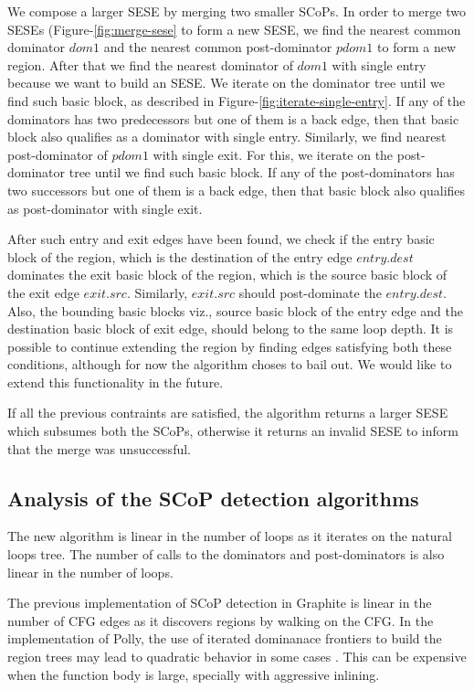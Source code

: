 \documentclass{sigplanconf}
\begin{document}

We compose a larger SESE by merging two smaller SCoPs. In order to merge two
SESEs (Figure-\ref{fig:merge-sese} to form a new SESE, we find the nearest
common dominator $dom1$ and the nearest common post-dominator $pdom1$ to form a
new region. After that we find the nearest dominator of $dom1$ with single entry
because we want to build an SESE.  We iterate on the dominator tree until we
find such basic block, as described in Figure-\ref{fig:iterate-single-entry}.
If any of the dominators has two predecessors but one of them is a back edge,
then that basic block also qualifies as a dominator with single entry.
Similarly, we find nearest post-dominator of $pdom1$ with single exit. For this,
we iterate on the post-dominator tree until we find such basic block. If any of
the post-dominators has two successors but one of them is a back edge, then that
basic block also qualifies as post-dominator with single exit.

After such entry and exit edges have been found, we check if the entry basic
block of the region, which is the destination of the entry edge $entry.dest$
dominates the exit basic block of the region, which is the source basic block of
the exit edge $exit.src$. Similarly, $exit.src$ should post-dominate the
$entry.dest$. Also, the bounding basic blocks viz., source basic block of the
entry edge and the destination basic block of exit edge, should belong to the
same loop depth. It is possible to continue extending the region by finding
edges satisfying both these conditions, although for now the algorithm choses
to bail out.  We would like to extend this functionality in the future.

If all the previous contraints are satisfied, the algorithm returns a larger
SESE which subsumes both the SCoPs, otherwise it returns an invalid SESE to
inform that the merge was unsuccessful.

\subsection{Analysis of the SCoP detection algorithms}
The new algorithm is linear in the number of loops as it iterates on the
natural loops tree.  The number of calls to the dominators and post-dominators
is also linear in the number of loops.

The previous implementation of SCoP detection in Graphite is linear in the
number of CFG edges as it discovers regions by walking on the CFG.  In the
implementation of Polly, the use of iterated dominanace frontiers to build the
region trees may lead to quadratic behavior in some cases \cite{ramalingam}.
This can be expensive when the function body is large, specially with aggressive
inlining.
\end{document}
